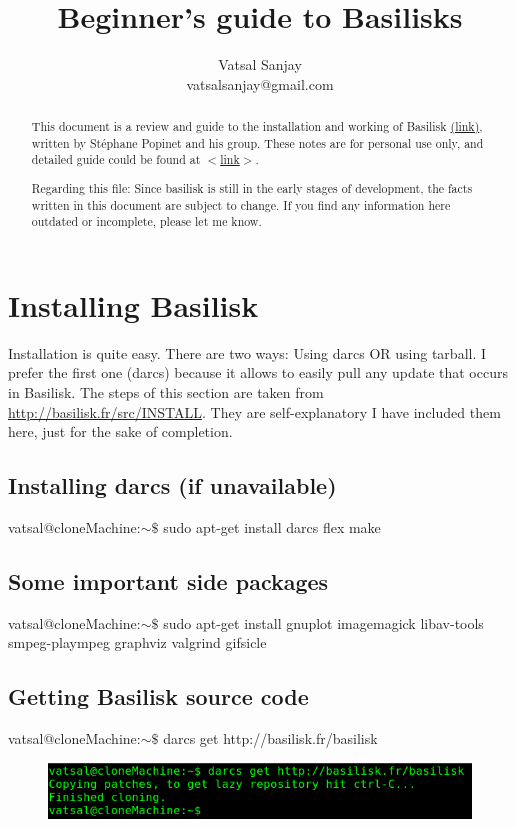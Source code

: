 \documentclass[]{article}
\title{\textbf{Beginner's guide to Basilisks}}
\author{Vatsal Sanjay\\vatsalsanjay@gmail.com}
\newcommand\Colorhref[3][blue]{\href{#2}{\color{#1}#3}}
\begin{document}
\maketitle
\begin{abstract}
This document is a review and guide to the installation and working of Basilisk \Colorhref{http://basilisk.fr/}{(link)}, written by St\'ephane Popinet and his group. These notes are for personal use only, and detailed guide could be found at \Colorhref{http://basilisk.fr/Tutorial}{$<$link$>$}.\\\par 
Regarding this file: Since basilisk is still in the early stages of development, the facts written in this document are subject to change. If you find any information here outdated or incomplete, please let me know.
\end{abstract}
\section{Installing Basilisk}
Installation is quite easy. There are two ways: Using darcs OR using tarball. I prefer the first one (darcs) because it allows to easily pull any update that occurs in Basilisk. The steps of this section are taken from \Colorhref{http://basilisk.fr/src/INSTALL}{http://basilisk.fr/src/INSTALL}. They are self-explanatory I have included them here, just for the sake of completion. 
\subsection{Installing darcs (if unavailable)}
{\color{red}vatsal@cloneMachine:$\sim\$$} sudo apt-get install darcs flex make
\subsection{Some important side packages}
{\color{red}vatsal@cloneMachine:$\sim\$$} sudo apt-get install gnuplot imagemagick libav-tools smpeg-plaympeg graphviz valgrind gifsicle
\subsection{Getting Basilisk source code}
{\color{red}vatsal@cloneMachine:$\sim\$$} darcs get http://basilisk.fr/basilisk
\begin{figure}[h]
\centering
\includegraphics[width=0.75\linewidth]{Figure1}
\end{figure}
\end{document}
